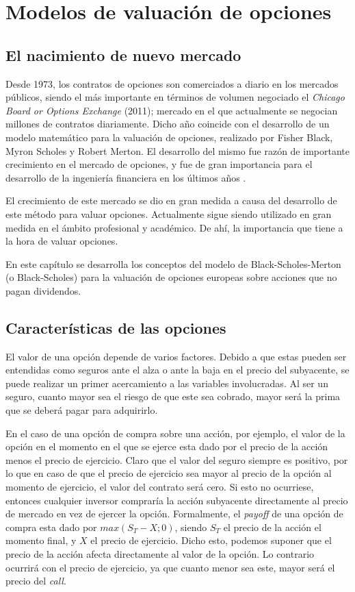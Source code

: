 

\chapter{Modelos de valuación de opciones}

\section{El nacimiento de nuevo mercado}

Desde 1973, los contratos de opciones son comerciados a diario en los mercados públicos, siendo el más importante en términos de volumen negociado el \textit{Chicago Board or Options Exchange} (2011)\nocite{cboe}; mercado en el que actualmente se negocian millones de contratos diariamente. Dicho año coincide con el desarrollo de un modelo matemático para la valuación de opciones, realizado por Fisher Black, Myron Scholes y Robert Merton. El desarrollo del mismo fue razón de importante crecimiento en el mercado de opciones, y fue de gran importancia para el desarrollo de la ingeniería financiera en los últimos años \cite{hull}.

El crecimiento de este mercado se dio en gran medida a causa del desarrollo de este método para valuar opciones. Actualmente sigue siendo utilizado en gran medida en el ámbito profesional y académico. De ahí, la importancia que tiene a la hora de valuar opciones.

En este capítulo se desarrolla los conceptos del modelo de Black-Scholes-Merton (o Black-Scholes) para la valuación de opciones europeas sobre acciones que no pagan dividendos.

\section{Características de las opciones}

El valor de una opción depende de varios factores. Debido a que estas pueden ser entendidas como seguros ante el alza o ante la baja en el precio del subyacente, se puede realizar un primer acercamiento a las variables involucradas. Al ser un seguro, cuanto mayor sea el riesgo de que este sea cobrado, mayor será la prima que se deberá pagar para adquirirlo.

En el caso de una opción de compra sobre una acción, por ejemplo, el valor de la opción en el momento en el que se ejerce esta dado por el precio de la acción menos el precio de ejercicio. Claro que el valor del seguro siempre es positivo, por lo que en caso de que el precio de ejercicio sea mayor al precio de la opción al momento de ejercicio, el valor del contrato será cero. Si esto no ocurriese, entonces cualquier inversor compraría la acción subyacente directamente al precio de mercado en vez de ejercer la opción. Formalmente, el \textit{payoff} de una opción de compra esta dado por $ max(S_T - X ; 0) $, siendo $ S_T $ el precio de la acción el momento final, y $ X $ el precio de ejercicio. Dicho esto, podemos suponer que el precio de la acción afecta directamente al valor de la opción. Lo contrario ocurrirá con el precio de ejercicio, ya que cuanto menor sea este, mayor será el precio del \textit{call}.


